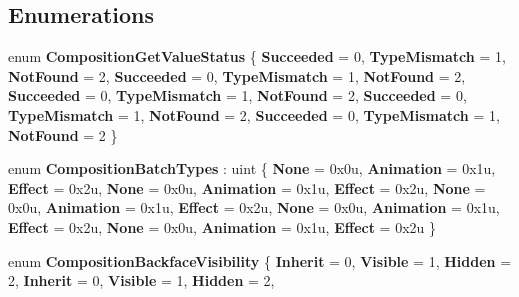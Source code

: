 \subsection*{Enumerations}
\begin{DoxyCompactItemize}
\item 
\mbox{\label{namespace_windows_1_1_u_i_1_1_composition_a9ddfa4d3a911ddf582cee8e20b4e8748}} 
enum {\bfseries Composition\+Get\+Value\+Status} \{ \newline
{\bfseries Succeeded} = 0, 
{\bfseries Type\+Mismatch} = 1, 
{\bfseries Not\+Found} = 2, 
{\bfseries Succeeded} = 0, 
\newline
{\bfseries Type\+Mismatch} = 1, 
{\bfseries Not\+Found} = 2, 
{\bfseries Succeeded} = 0, 
{\bfseries Type\+Mismatch} = 1, 
\newline
{\bfseries Not\+Found} = 2, 
{\bfseries Succeeded} = 0, 
{\bfseries Type\+Mismatch} = 1, 
{\bfseries Not\+Found} = 2, 
\newline
{\bfseries Succeeded} = 0, 
{\bfseries Type\+Mismatch} = 1, 
{\bfseries Not\+Found} = 2
 \}
\item 
\mbox{\label{namespace_windows_1_1_u_i_1_1_composition_aee18d765e5fb2f69e4c1656c628cd576}} 
enum {\bfseries Composition\+Batch\+Types} \+: uint \{ \newline
{\bfseries None} = 0x0u, 
{\bfseries Animation} = 0x1u, 
{\bfseries Effect} = 0x2u, 
{\bfseries None} = 0x0u, 
\newline
{\bfseries Animation} = 0x1u, 
{\bfseries Effect} = 0x2u, 
{\bfseries None} = 0x0u, 
{\bfseries Animation} = 0x1u, 
\newline
{\bfseries Effect} = 0x2u, 
{\bfseries None} = 0x0u, 
{\bfseries Animation} = 0x1u, 
{\bfseries Effect} = 0x2u, 
\newline
{\bfseries None} = 0x0u, 
{\bfseries Animation} = 0x1u, 
{\bfseries Effect} = 0x2u
 \}
\item 
\mbox{\label{namespace_windows_1_1_u_i_1_1_composition_a2208fe30c093609e4c2f6f06851913d2}} 
enum {\bfseries Composition\+Backface\+Visibility} \{ \newline
{\bfseries Inherit} = 0, 
{\bfseries Visible} = 1, 
{\bfseries Hidden} = 2, 
{\bfseries Inherit} = 0, 
\newline
{\bfseries Visible} = 1, 
{\bfseries Hidden} = 2, 

\end{DoxyCompactItemize}
